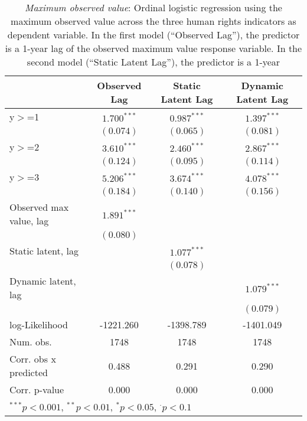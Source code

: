 
\begin{table}[h]
\begin{center}
\begin{tabular}{l c c c }
\hline
 & Observed Lag & Static Latent Lag & Dynamic Latent Lag \\
\hline
y$>$=1                  & $1.700^{***}$ & $0.987^{***}$ & $1.397^{***}$ \\
                        & $(0.074)$     & $(0.065)$     & $(0.081)$     \\
y$>$=2                  & $3.610^{***}$ & $2.460^{***}$ & $2.867^{***}$ \\
                        & $(0.124)$     & $(0.095)$     & $(0.114)$     \\
y$>$=3                  & $5.206^{***}$ & $3.674^{***}$ & $4.078^{***}$ \\
                        & $(0.184)$     & $(0.140)$     & $(0.156)$     \\
Observed max value, lag & $1.891^{***}$ &               &               \\
                        & $(0.080)$     &               &               \\
Static  latent, lag     &               & $1.077^{***}$ &               \\
                        &               & $(0.078)$     &               \\
Dynamic latent, lag     &               &               & $1.079^{***}$ \\
                        &               &               & $(0.079)$     \\
\hline
log-Likelihood          & -1221.260     & -1398.789     & -1401.049     \\
Num. obs.               & 1748          & 1748          & 1748          \\
Corr. obs x predicted   & 0.488         & 0.291         & 0.290         \\
Corr. p-value           & 0.000         & 0.000         & 0.000         \\
\hline
\multicolumn{4}{l}{\scriptsize{$^{***}p<0.001$, $^{**}p<0.01$, $^*p<0.05$, $^{\cdot}p<0.1$}}
\end{tabular}
\caption{\emph{Maximum observed value}: Ordinal logistic regression using the maximum observed
       value across the three human rights 
       indicators as dependent variable. In the first model (``Observed Lag''), the predictor is a 1-year lag
       of the observed maximum value response variable. In the second model (``Static Latent Lag''), the predictor is a 1-year
}
\end{center}
\end{table}
